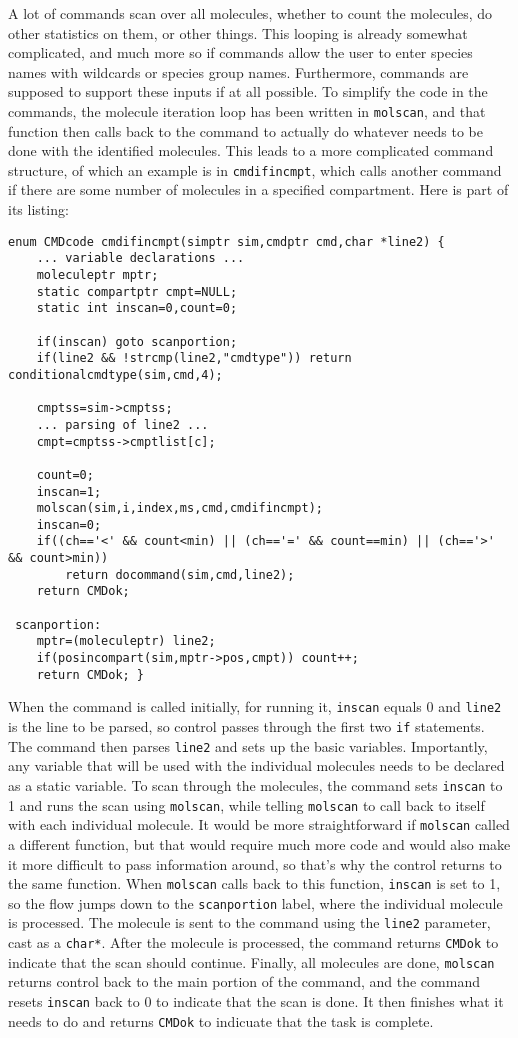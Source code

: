 \documentclass {scrbook}
\newcommand {\ttt} {\texttt}
\begin{document}
A lot of commands scan over all molecules, whether to count the molecules, do other statistics on them, or other things. This looping is already somewhat complicated, and much more so if commands allow the user to enter species names with wildcards or species group names. Furthermore, commands are supposed to support these inputs if at all possible. To simplify the code in the commands, the molecule iteration loop has been written in \ttt{molscan}, and that function then calls back to the command to actually do whatever needs to be done with the identified molecules. This leads to a more complicated command structure, of which an example is in \ttt{cmdifincmpt}, which calls another command if there are some number of molecules in a specified compartment. Here is part of its listing:

\begin{lstlisting}
enum CMDcode cmdifincmpt(simptr sim,cmdptr cmd,char *line2) {
	... variable declarations ...
	moleculeptr mptr;
	static compartptr cmpt=NULL;
	static int inscan=0,count=0;

	if(inscan) goto scanportion;
	if(line2 && !strcmp(line2,"cmdtype")) return conditionalcmdtype(sim,cmd,4);

	cmptss=sim->cmptss;
	... parsing of line2 ...
	cmpt=cmptss->cmptlist[c];

	count=0;
	inscan=1;
	molscan(sim,i,index,ms,cmd,cmdifincmpt);
	inscan=0;
	if((ch=='<' && count<min) || (ch=='=' && count==min) || (ch=='>' && count>min))
		return docommand(sim,cmd,line2);
	return CMDok;

 scanportion:
	mptr=(moleculeptr) line2;
	if(posincompart(sim,mptr->pos,cmpt)) count++;
	return CMDok; }
\end{lstlisting}

When the command is called initially, for running it, \ttt{inscan} equals 0 and \ttt{line2} is the line to be parsed, so control passes through the first two \ttt{if} statements. The command then parses \ttt{line2} and sets up the basic variables. Importantly, any variable that will be used with the individual molecules needs to be declared as a static variable. To scan through the molecules, the command sets \ttt{inscan} to 1 and runs the scan using \ttt{molscan}, while telling \ttt{molscan} to call back to itself with each individual molecule. It would be more straightforward if \ttt{molscan} called a different function, but that would require much more code and would also make it more difficult to pass information around, so that's why the control returns to the same function. When \ttt{molscan} calls back to this function, \ttt{inscan} is set to 1, so the flow jumps down to the \ttt{scanportion} label, where the individual molecule is processed. The molecule is sent to the command using the \ttt{line2} parameter, cast as a \ttt{char*}. After the molecule is processed, the command returns \ttt{CMDok} to indicate that the scan should continue. Finally, all molecules are done, \ttt{molscan} returns control back to the main portion of the command, and the command resets \ttt{inscan} back to 0 to indicate that the scan is done. It then finishes what it needs to do and returns \ttt{CMDok} to indicuate that the task is complete.
\end{document}

